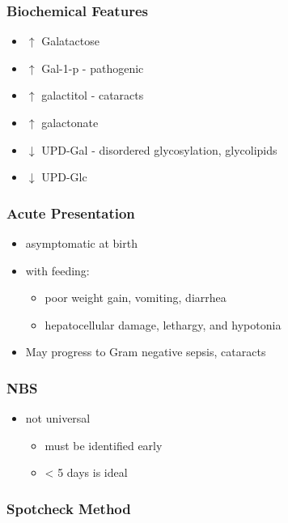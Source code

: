 \documentclass{scrartcl}
\begin{document}
\subsubsection{Biochemical Features}
\label{sec:org70aaa3e}
\begin{itemize}
\item \(\uparrow\)  Galatactose
\item \(\uparrow\) Gal-1-p - pathogenic
\item \(\uparrow\)  galactitol - cataracts
\item \(\uparrow\) galactonate
\item \(\downarrow\) UPD-Gal - disordered glycosylation, glycolipids
\item \(\downarrow\) UPD-Glc
\end{itemize}

\subsubsection{Acute Presentation}
\label{sec:org4ec2ad6}
\begin{itemize}
\item asymptomatic at birth
\item with feeding:
\begin{itemize}
\item poor weight gain, vomiting, diarrhea
\item hepatocellular damage, lethargy, and hypotonia
\end{itemize}
\item May progress to Gram negative sepsis, cataracts
\end{itemize}

\subsubsection{NBS}
\label{sec:org8a6c593}
\begin{itemize}
\item not universal
\begin{itemize}
\item must be identified early
\item \textless{} 5 days is ideal
\end{itemize}
\end{itemize}

\subsubsection{Spotcheck Method}
\label{sec:org4b5c766}
\end{document}

